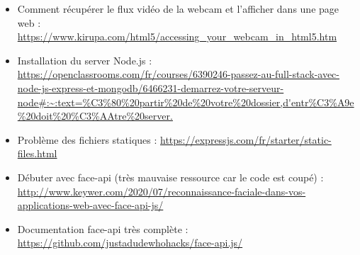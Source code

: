 \begin{itemize}
    \item Comment récupérer le flux vidéo de la webcam et l'afficher dans une page web : 
    \url{https://www.kirupa.com/html5/accessing_your_webcam_in_html5.htm}
    \item Installation du server Node.js :
    \url{https://openclassrooms.com/fr/courses/6390246-passez-au-full-stack-avec-node-js-express-et-mongodb/6466231-demarrez-votre-serveur-node#:~:text=%C3%80%20partir%20de%20votre%20dossier,d'entr%C3%A9e%20doit%20%C3%AAtre%20server.}
    \item Problème des fichiers statiques :
    \url{https://expressjs.com/fr/starter/static-files.html}
    \item Débuter avec face-api (très mauvaise ressource car le code est coupé) :
    \url{http://www.keywer.com/2020/07/reconnaissance-faciale-dans-vos-applications-web-avec-face-api-js/}
    \item Documentation face-api très complète :
    \url{https://github.com/justadudewhohacks/face-api.js/}  
\end{itemize}